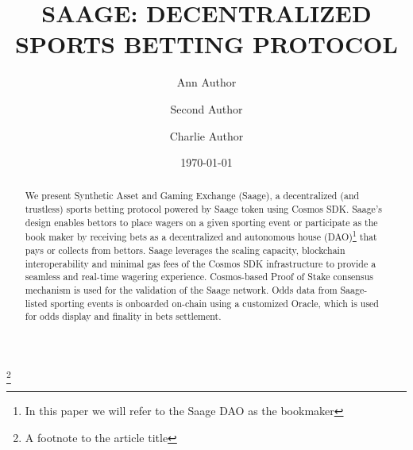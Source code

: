 \documentclass[%
 reprint,
 amsmath,amssymb,
 aps,
]{revtex4-2}
\begin{document}

\title{SAAGE: DECENTRALIZED SPORTS BETTING PROTOCOL}%
\thanks{A footnote to the article title}%

\author{Ann Author}
\author{Second Author}%
%


\author{Charlie Author}
%
%


\date{\today}%

\begin{abstract}
We present Synthetic Asset and Gaming Exchange (Saage), a decentralized (and trustless) sports betting protocol powered by Saage token using Cosmos SDK. Saage’s design enables bettors to place wagers on a given sporting event or participate as the book maker by receiving bets as a decentralized and autonomous house (DAO)\footnote{In this paper we will refer to the Saage DAO as the bookmaker} that pays or collects from bettors. Saage leverages the scaling capacity, blockchain interoperability and minimal gas fees of the Cosmos SDK infrastructure to provide a seamless and real-time wagering experience. Cosmos-based Proof of Stake consensus mechanism is used for the validation of the Saage network. Odds data from Saage-listed sporting events is onboarded on-chain using a customized Oracle, which is used for odds display and finality in bets settlement.
\end{abstract}
\end{document}
